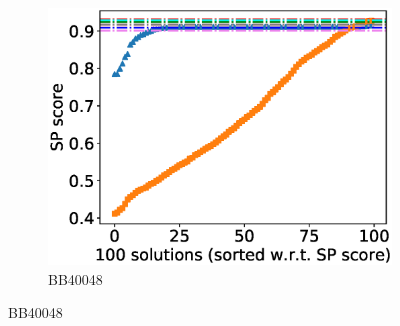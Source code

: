 \begin{figure}[!htbp]
\begin{adjustwidth}{-1cm}{-1cm}
\begin{subfigure}{0.22\textwidth}
			\includegraphics[width=\columnwidth]{Figure/summary/precomputedInit/Balibase/BB40048_pairs_density_single_run_2}
			\caption{BB40048}
		\end{subfigure}
		

\end{adjustwidth}
\end{figure}
